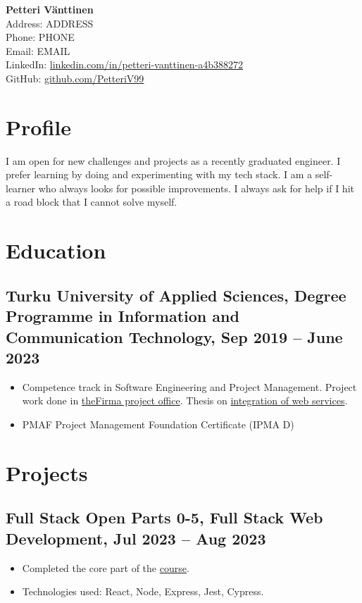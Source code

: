 \documentclass[a4paper,10pt]{article}
\begin{document}
\pagestyle{empty}

\begin{center}
    \textbf{\LARGE Petteri Vänttinen} \\
    Address: ADDRESS \\
    Phone: PHONE \\
    Email: EMAIL \\
    LinkedIn: \href{https://www.linkedin.com/in/petteri-vanttinen-a4b388272/}{linkedin.com/in/petteri-vanttinen-a4b388272} \\
    GitHub: \href{https://github.com/PetteriV99}{github.com/PetteriV99}
\end{center}

\section*{Profile}

I am open for new challenges and projects as a recently graduated engineer. I prefer learning by doing and experimenting with my tech stack. I am a self-learner who always looks for possible improvements. I always ask for help if I hit a road block that I cannot solve myself.

\section*{Education}
\subsection*{\textbf{Turku University of Applied Sciences}, Degree Programme in Information and Communication Technology, Sep 2019 -- June 2023}
\begin{itemize}
    \item Competence track in Software Engineering and Project Management. Project work done in \href{https://www.turkuamk.fi/fi/artikkelit/3090/thefirma-tarjoaa-palveluita-asiakkaille-ja-mahdollisuuksia-opiskelijoille/}{theFirma project office}. Thesis on \href{https://www.theseus.fi/handle/10024/803366}{integration of web services}.
    \item PMAF Project Management Foundation Certificate (IPMA D)
\end{itemize}

\section*{Projects}
\subsection*{Full Stack Open Parts 0-5, Full Stack Web Development, Jul 2023 -- Aug 2023}
\begin{itemize}
    \item Completed the core part of the \href{https://fullstackopen.com/en/part0/general_info}{course}.
    \item Technologies used: React, Node, Express, Jest, Cypress.
\end{itemize}
\end{document}
